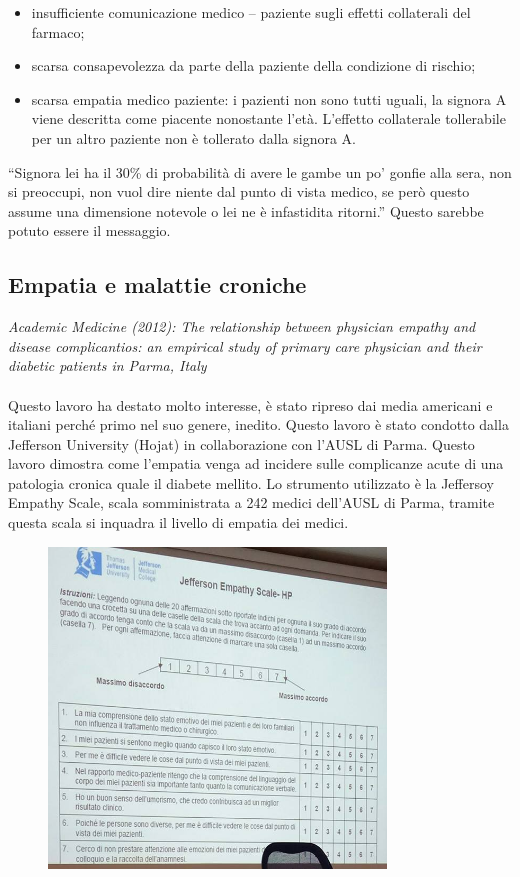\begin{itemize}
\item
  insufficiente comunicazione medico -- paziente sugli effetti
  collaterali del farmaco;
\item
  scarsa consapevolezza da parte della paziente della condizione di
  rischio;
\item
  scarsa empatia medico paziente: i pazienti non sono tutti uguali, la
  signora A viene descritta come piacente nonostante l'età. L'effetto
  collaterale tollerabile per un altro paziente non è tollerato dalla
  signora A.
\end{itemize}

``Signora lei ha il 30\% di probabilità di avere le gambe un po' gonfie
alla sera, non si preoccupi, non vuol dire niente dal punto di vista
medico, se però questo assume una dimensione notevole o lei ne è
infastidita ritorni.'' Questo sarebbe potuto essere il messaggio.

\subsection{Empatia e malattie croniche}

\emph{Academic Medicine (2012): The relationship between physician
empathy and disease complicantios: an empirical study of primary care
physician and their diabetic patients in Parma, Italy}
\\\\
Questo lavoro ha destato molto interesse, è stato ripreso dai media
americani e italiani perché primo nel suo genere, inedito. Questo lavoro
è stato condotto dalla Jefferson University (Hojat) in collaborazione
con l'AUSL di Parma. Questo lavoro dimostra come l'empatia venga ad
incidere sulle complicanze acute di una patologia cronica quale il
diabete mellito. Lo strumento utilizzato è la Jeffersoy Empathy Scale,
scala somministrata a 242 medici dell'AUSL di Parma, tramite questa
scala si inquadra il livello di empatia dei medici.

\begin{figure}[!ht]
\centering
	\includegraphics[width=0.8\textwidth]{41/image8.jpeg}
	\end{figure}
	
